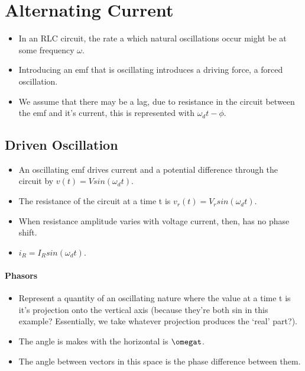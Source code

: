 \documentclass[11pt]{article}
\begin{document}
\hypertarget{alternating-current}{%
\section{Alternating Current}\label{alternating-current}}

\begin{itemize}
\tightlist
\item
  In an RLC circuit, the rate a which natural oscillations occur might
  be at some frequency \(\omega\).
\item
  Introducing an emf that is oscillating introduces a driving force, a
  forced oscillation.
\item
  We assume that there may be a lag, due to resistance in the circuit
  between the emf and it's current, this is represented with
  \(\omega_dt - \phi\).
\end{itemize}

\hypertarget{driven-oscillation}{%
\subsection{Driven Oscillation}\label{driven-oscillation}}

\begin{itemize}
\tightlist
\item
  An oscillating emf drives current and a potential difference through
  the circuit by \(v(t) = Vsin(\omega_dt)\).
\item
  The resistance of the circuit at a time t is
  \(v_r(t) = V_rsin(\omega_dt)\).
\item
  When resistance amplitude varies with voltage current, then, has no
  phase shift.
\item
  \(i_R = I_Rsin(\omega_dt)\).
\end{itemize}

\hypertarget{phasors}{%
\paragraph{Phasors}\label{phasors}}

\begin{itemize}
\tightlist
\item
  Represent a quantity of an oscillating nature where the value at a
  time t is it's projection onto the vertical axis (because they're both
  sin in this example? Essentially, we take whatever projection produces
  the `real' part?).
\item
  The angle is makes with the horizontal is \(\omegat\).
\item
  The angle between vectors in this space is the phase difference
  between them.
\end{itemize}
\end{document}

